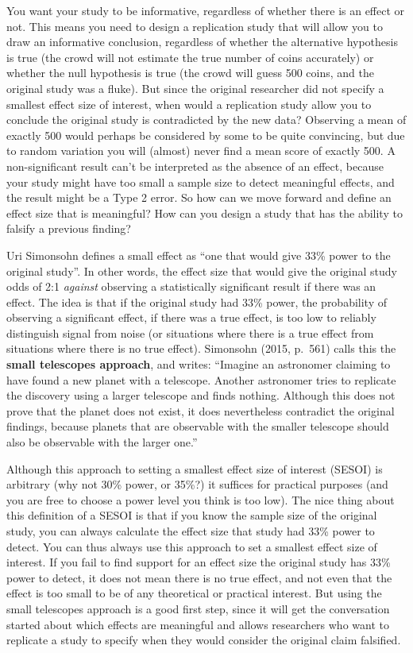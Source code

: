 \documentclass[
  oneside]{krantz}
\begin{document}
You want your study to be informative, regardless of whether there is an effect or not. This means you need to design a replication study that will allow you to draw an informative conclusion, regardless of whether the alternative hypothesis is true (the crowd will not estimate the true number of coins accurately) or whether the null hypothesis is true (the crowd will guess 500 coins, and the original study was a fluke). But since the original researcher did not specify a smallest effect size of interest, when would a replication study allow you to conclude the original study is contradicted by the new data? Observing a mean of exactly 500 would perhaps be considered by some to be quite convincing, but due to random variation you will (almost) never find a mean score of exactly 500. A non-significant result can't be interpreted as the absence of an effect, because your study might have too small a sample size to detect meaningful effects, and the result might be a Type 2 error. So how can we move forward and define an effect size that is meaningful? How can you design a study that has the ability to falsify a previous finding?

Uri Simonsohn \citeyearpar{simonsohn_small_2015} defines a small effect as ``one that would give 33\% power to the original study''. In other words, the effect size that would give the original study odds of 2:1 \emph{against} observing a statistically significant result if there was an effect. The idea is that if the original study had 33\% power, the probability of observing a significant effect, if there was a true effect, is too low to reliably distinguish signal from noise (or situations where there is a true effect from situations where there is no true effect). Simonsohn (2015, p.~561) calls this the \textbf{small telescopes approach}, and writes: ``Imagine an astronomer claiming to have found a new planet with a telescope. Another astronomer tries to replicate the discovery using a larger telescope and finds nothing. Although this does not prove that the planet does not exist, it does nevertheless contradict the original findings, because planets that are observable with the smaller telescope should also be observable with the larger one.''

Although this approach to setting a smallest effect size of interest (SESOI) is arbitrary (why not 30\% power, or 35\%?) it suffices for practical purposes (and you are free to choose a power level you think is too low). The nice thing about this definition of a SESOI is that if you know the sample size of the original study, you can always calculate the effect size that study had 33\% power to detect. You can thus always use this approach to set a smallest effect size of interest. If you fail to find support for an effect size the original study has 33\% power to detect, it does not mean there is no true effect, and not even that the effect is too small to be of any theoretical or practical interest. But using the small telescopes approach is a good first step, since it will get the conversation started about which effects are meaningful and allows researchers who want to replicate a study to specify when they would consider the original claim falsified.
\end{document}
